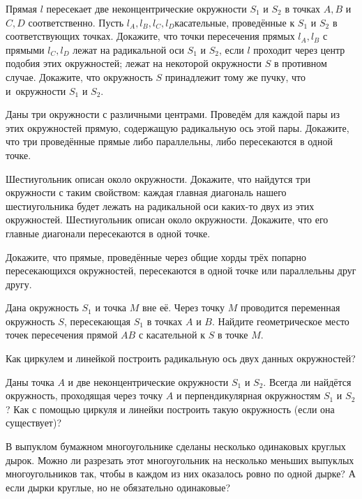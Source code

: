 \documentclass[a4paper,12pt]{article}
\begin{document}
Прямая $l$ пересекает две неконцентрические окружности $S_1$ и $S_2$ в точках $A,B$ и $C,D$ соответственно. Пусть $l_A,l_B,l_C,l_D$\т касательные, проведённые к $S_1$ и $S_2$ в соответствующих точках. Докажите, что точки пересечения прямых $l_A,l_B$ с прямыми $l_C,l_D$
лежат на радикальной оси $S_1$ и $S_2$, если $l$ проходит через центр подобия этих окружностей;
лежат на некоторой окружности $S$ в противном случае.
Докажите, что окружность $S$ принадлежит тому же пучку, что и~окружности $S_1$ и $S_2$.


Даны три окружности с различными центрами. Проведём для каждой пары из этих окружностей прямую, содержащую радикальную ось этой пары. Докажите, что три проведённые прямые либо параллельны, либо пересекаются в одной точке.

Шестиугольник описан около окружности. Докажите, что найдутся три окружности с таким свойством: каждая главная диагональ нашего шестиугольника будет лежать
на радикальной оси каких-то двух из этих окружностей.
Шестиугольник описан около окружности. Докажите, что его главные диагонали пересекаются в одной точке.

Докажите, что прямые, проведённые через общие хорды трёх попарно пересекающихся окружностей, пересекаются в одной точке или параллельны друг другу.

Дана окружность $S_1$ и точка $M$ вне её. Через точку $M$ проводится переменная окружность $S$, пересекающая $S_1$ в точках $A$ и $B$. Найдите геометрическое место точек пересечения прямой $AB$ с касательной к $S$ в точке $M$.

Как циркулем и линейкой построить радикальную ось двух данных окружностей?

Даны точка $A$ и две неконцентрические окружности $S_1$ и $S_2$. Всегда ли найдётся окружность, проходящая через точку $A$ и перпендикулярная окружностям $S_1$ и $S_2$?
Как с помощью циркуля и линейки построить такую окружность (если она существует)?

 В выпуклом бумажном многоугольнике сделаны несколько одинаковых круглых дырок. Можно ли разрезать этот многоугольник на несколько меньших выпуклых многоугольников так, чтобы в каждом из них оказалось ровно по одной дырке?
 А если дырки круглые, но не обязательно одинаковые?

\vfill
{}
\end{document}
